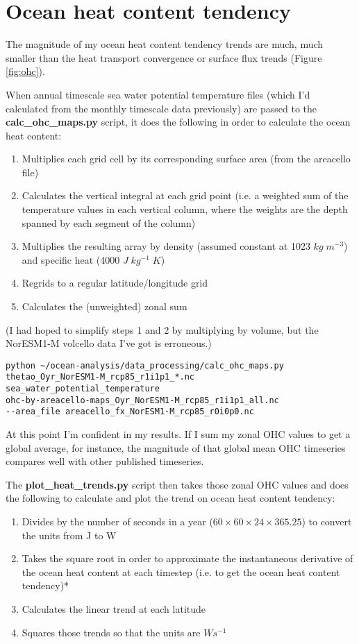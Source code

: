 \section{Ocean heat content tendency}

The magnitude of my ocean heat content tendency trends are much, much smaller than the heat transport convergence or surface flux trends (Figure \ref{fig:ohc}). 

When annual timescale sea water potential temperature files (which I'd calculated from the monthly timescale data previously) are passed to the \textbf{calc_ohc_maps.py} script, it does the following in order to calculate the ocean heat content:
\begin{enumerate}
\item Multiplies each grid cell by its corresponding surface area (from the areacello file)
\item Calculates the vertical integral at each grid point (i.e. a weighted sum of the temperature values in each vertical column, where the weights are the depth spanned by each segment of the column)
\item Multiplies the resulting array by density (assumed constant at 1023 $kg\; m^{-3}$) and specific heat (4000 $J\; kg^{-1}\; K$)
\item Regrids to a regular latitude/longitude grid
\item Calculates the (unweighted) zonal sum
\end{enumerate}

(I had hoped to simplify steps 1 and 2 by multiplying by volume, but the NorESM1-M volcello data I've got is erroneous.) 

\begin{verbatim}
python ~/ocean-analysis/data_processing/calc_ohc_maps.py 
thetao_Oyr_NorESM1-M_rcp85_r1i1p1_*.nc 
sea_water_potential_temperature 
ohc-by-areacello-maps_Oyr_NorESM1-M_rcp85_r1i1p1_all.nc 
--area_file areacello_fx_NorESM1-M_rcp85_r0i0p0.nc
\end{verbatim}

At this point I'm confident in my results. If I sum my zonal OHC values to get a global average, for instance, the magnitude of that global mean OHC timeseries compares well with other published timeseries.

The \textbf{plot_heat_trends.py} script then takes those zonal OHC values and does the following to calculate and plot the trend on ocean heat content tendency:
\begin{enumerate}
\item Divides by the number of seconds in a year ($60 \times 60 \times 24 \times 365.25$) to convert the units from J to W
\item Takes the square root in order to approximate the instantaneous derivative of the ocean heat content at each timestep (i.e. to get the ocean heat content tendency)*
\item Calculates the linear trend at each latitude
\item Squares those trends so that the units are $W s^{-1}$
\end{enumerate}


